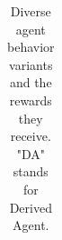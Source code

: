 {\begin{table}
\begin{longtable}{l|ccccccc|l}
    
    \caption{Diverse agent behavior variants and the rewards they receive. "DA" stands for Derived Agent.}
    \label{appendix:baselines_observations}
    
    \end{longtable}%

       
\end{table}
}
 
